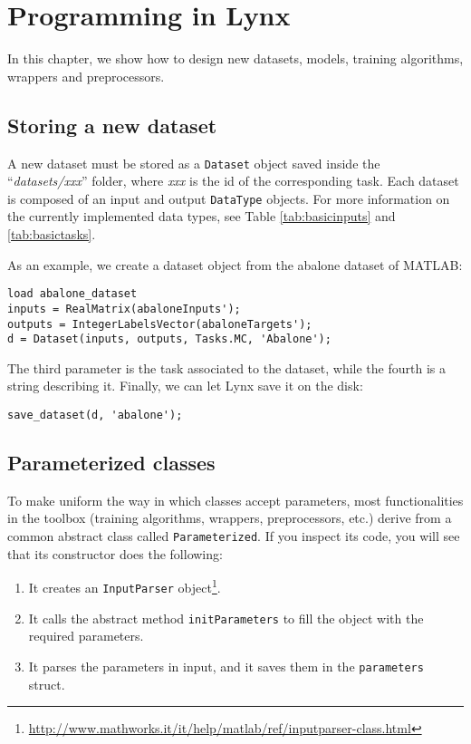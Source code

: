 \chapter{Programming in Lynx}
\label{chap:programminglynx}

In this chapter, we show how to design new datasets, models, training algorithms, wrappers and preprocessors.

\section{Storing a new dataset}

A new dataset must be stored as a \verb|Dataset| object saved inside the ``\textit{datasets/xxx}'' folder, where \textit{xxx} is the id of the corresponding task. Each dataset is composed of an input and output \verb|DataType| objects. For more information on the currently implemented data types, see Table \ref{tab:basicinputs} and \ref{tab:basictasks}. 

As an example, we create a dataset object from the abalone dataset of MATLAB:

\begin{lstlisting}
load abalone_dataset
inputs = RealMatrix(abaloneInputs');
outputs = IntegerLabelsVector(abaloneTargets');
d = Dataset(inputs, outputs, Tasks.MC, 'Abalone');
\end{lstlisting} 

\noindent The third parameter is the task associated to the dataset, while the fourth is a string describing it. Finally, we can let Lynx save it on the disk:

\begin{lstlisting}
save_dataset(d, 'abalone');
\end{lstlisting}

\section{Parameterized classes}
\label{sec:parameterizedclasses}

To make uniform the way in which classes accept parameters, most functionalities in the toolbox (training algorithms, wrappers, preprocessors, etc.) derive from a common abstract class called \verb|Parameterized|. If you inspect its code, you will see that its constructor does the following:

\begin{enumerate}
\item It creates an \verb|InputParser| object\footnote{\url{http://www.mathworks.it/it/help/matlab/ref/inputparser-class.html}}.
\item It calls the abstract method \verb|initParameters| to fill the object with the required parameters.
\item It parses the parameters in input, and it saves them in the \verb|parameters| struct.
\end{enumerate}

